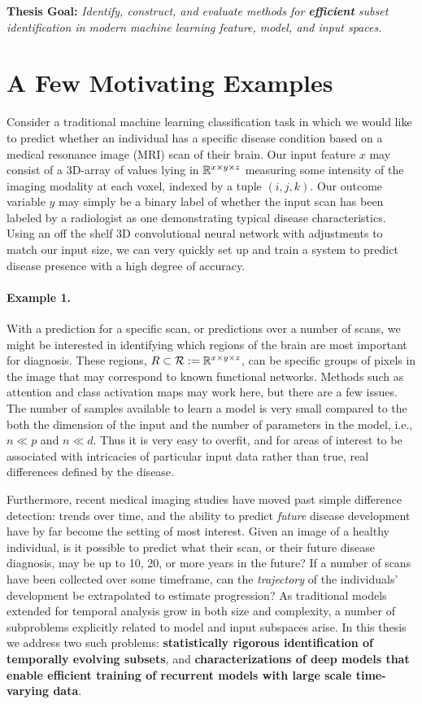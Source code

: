 \begin{mdframed}[style=MyFrame]
\textbf{ Thesis Goal: }
\em Identify, construct, and evaluate methods for \textbf{efficient} subset identification in modern machine learning feature, model, and input spaces.
\end{mdframed}

\section{A Few Motivating Examples}
Consider a traditional machine learning classification task in which we would like to predict whether an individual has a specific disease condition based on a medical resonance image (MRI) scan of their brain. Our input feature $x$ may consist of a 3D-array of values lying in $\mathbb{R}^{x\times y\times z}$ measuring some intensity of the imaging modality at each voxel, indexed by a tuple $(i,j,k)$.
Our outcome variable $y$ may simply be a binary label of whether the input scan has been labeled by a radiologist as one demonstrating typical disease characteristics.
Using an off the shelf 3D convolutional neural network with adjustments to match our input size, we can very quickly set up and train a system to predict disease presence with a high degree of accuracy.

\paragraph{Example 1.}
With a prediction for a specific scan, or predictions over a number of scans, we might be interested in identifying which regions of the brain are most important for diagnosis. These regions, $R \subset \mathcal{R}:=\mathbb{R}^{x\times y\times z}$, can be specific groups of pixels in the image that may correspond to known functional networks. Methods such as attention and class activation maps may work here, but there are a few issues. The number of samples available to learn a model is very small compared to the both the dimension of the input and the number of parameters in the model, i.e., $n \ll p$ and $n \ll d$. Thus it is very easy to overfit, and for areas of interest to be associated with intricacies of particular input data rather than true, real differences defined by the disease.

Furthermore, recent medical imaging studies have moved past simple difference detection: trends over time, and the ability to predict {\em future} disease development have by far become the setting of most interest.
Given an image of a healthy individual, is it possible to predict what their scan, or their future disease diagnosis, may be up to 10, 20, or more years in the future?
If a number of scans have been collected over some timeframe, can the \textit{trajectory} of the individuals' development be extrapolated to estimate progression?
As traditional models extended for temporal analysis grow in both size and complexity,
a number of subproblems explicitly related to model and input subspaces arise. In this thesis we address two such problems: \textbf{statistically rigorous identification of temporally evolving subsets}, and \textbf{characterizations of deep models that enable efficient training of recurrent models with large scale time-varying data}.
    
